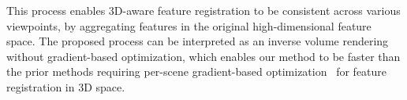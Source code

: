 This process enables 3D-aware feature registration to be consistent across various viewpoints, by aggregating features in the original high-dimensional feature space. The proposed process can be interpreted as an inverse volume rendering without gradient-based optimization, which enables our method to be faster than the prior methods requiring per-scene gradient-based optimization~\cite{langsplat, open_scene,legaussian} for feature registration in 3D space.

